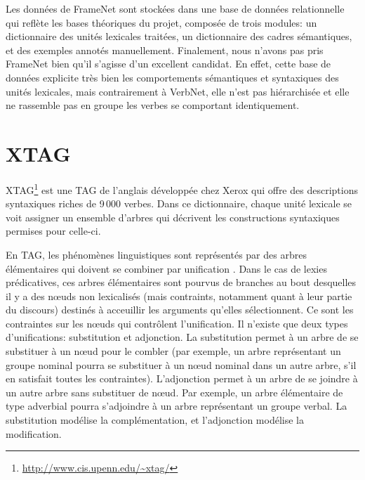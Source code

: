 Les données de FrameNet sont stockées dans une base de données relationnelle qui reflète les bases théoriques du projet, composée de trois modules: un dictionnaire des unités lexicales traitées, un dictionnaire des cadres sémantiques, et des exemples annotés manuellement. Finalement, nous n'avons pas pris FrameNet bien qu'il s'agisse d'un excellent candidat. En effet, cette base de données explicite très bien les comportements sémantiques et syntaxiques des unités lexicales, mais contrairement à VerbNet, elle n'est pas hiérarchisée et elle ne rassemble pas en groupe les verbes se comportant identiquement. 

\section{XTAG}

XTAG\footnote{\url{http://www.cis.upenn.edu/~xtag/}} est une \ac{TAG} de l'anglais développée chez Xerox \citep{XTAGResearchGroupLexicalizedTreeAdjoining2001, ParoubekXTAGGraphicalWorkbench1992} qui offre des descriptions syntaxiques riches de 9\,000 verbes. Dans ce dictionnaire, chaque unité lexicale se voit assigner un ensemble d'arbres qui décrivent les constructions syntaxiques permises pour celle-ci.

En \ac{TAG}, les phénomènes linguistiques sont représentés par des arbres élémentaires qui doivent se combiner par unification \citep{JoshiTreeAdjoiningGrammars1997}. Dans le cas de lexies prédicatives, ces arbres élémentaires sont pourvus de branches au bout desquelles il y a des n\oe{}uds non lexicalisés (mais contraints, notamment quant à leur partie du discours) destinés à acceuillir les arguments qu'elles sélectionnent. Ce sont les contraintes sur les n\oe{}uds qui contrôlent l'unification. Il n'existe que deux types d'unifications: substitution et adjonction. La substitution permet à un arbre de se substituer à un n\oe{}ud pour le combler (par exemple, un arbre représentant un groupe nominal pourra se substituer à un n\oe{}ud nominal dans un autre arbre, s'il en satisfait toutes les contraintes). L'adjonction permet à un arbre de se joindre à un autre arbre sans substituer de n\oe{}ud. Par exemple, un arbre élémentaire de type adverbial pourra s'adjoindre à un arbre représentant un groupe verbal. La substitution modélise la complémentation, et l'adjonction modélise la modification.

